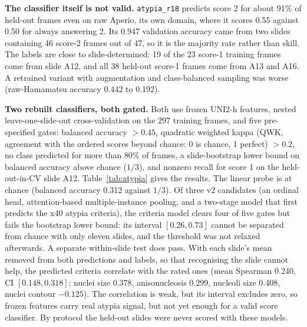 \textbf{The classifier itself is not valid.} \texttt{atypia\_r18} predicts score 2 for about 91\% of held-out
frames even on raw Aperio, its own domain, where it scores 0.55 against 0.50 for always answering 2. Its
0.947 validation accuracy came from two slides containing 46 score-2 frames out of 47, so it is the
majority rate rather than skill. The labels are close to slide-determined: 19 of the 23 score-1 training
frames come from slide A12, and all 38 held-out score-1 frames come from A13 and A16. A retrained variant
with augmentation and class-balanced sampling was worse (raw-Hamamatsu accuracy 0.442 to 0.192).

\textbf{Two rebuilt classifiers, both gated.} Both use frozen UNI2-h features, nested leave-one-slide-out
cross-validation on the 297 training frames, and five pre-specified gates: balanced accuracy $>0.45$,
quadratic weighted kappa (QWK, agreement with the ordered scores beyond chance: 0 is chance, 1 perfect) $>0.2$, no class predicted for more than 80\% of frames, a slide-bootstrap
lower bound on balanced accuracy above chance ($1/3$), and nonzero recall for score 1 on the held-out-in-CV
slide A12. Table~\ref{tab:atypia} gives the results. The linear probe is at chance (balanced accuracy 0.312 against $1/3$). Of three v2 candidates
(an ordinal head, attention-based multiple-instance pooling, and a two-stage model that first predicts the
x40 atypia criteria), the criteria model clears four of five gates but fails the bootstrap lower bound:
its interval $[0.26, 0.73]$ cannot be separated from chance with only eleven slides, and the threshold was
not relaxed afterwards. A separate within-slide test does pass. With each slide's mean removed from both
predictions and labels, so that recognising the slide cannot help, the predicted criteria correlate with
the rated ones (mean Spearman 0.240, CI $[0.148, 0.318]$; nuclei size 0.378, anisonucleosis 0.299,
nucleoli size 0.408, nuclei contour $-0.125$). The correlation is weak, but its interval excludes zero, so frozen features carry real atypia signal, but not
yet enough for a valid score classifier. By protocol the held-out slides were never scored with these
models.


